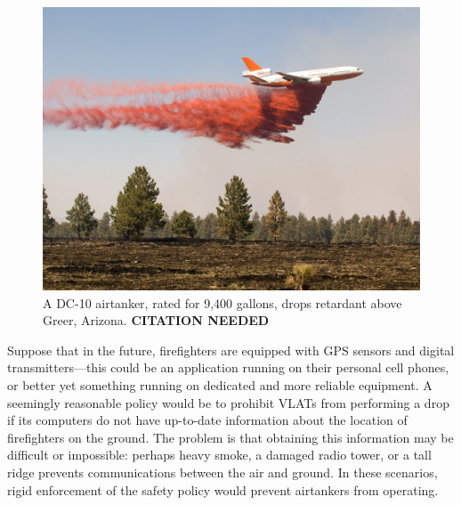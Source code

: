 \documentclass[]             %
{NASA}                       %
\theoremstyle{definition}
\begin{document}
\begin{figure}[h]
  \label{fig:airtanker}
  \centering
  \includegraphics[scale=0.4]{images/dc10.jpg}
  \caption{A DC-10 airtanker, rated for 9,400 gallons, drops retardant above Greer, Arizona. \textbf{CITATION NEEDED}}
\end{figure}

Suppose that in the future, firefighters are equipped with GPS sensors
and digital transmitters---this could be an application running on
their personal cell phones, or better yet something running on
dedicated and more reliable equipment. A seemingly reasonable policy
would be to prohibit VLATs from performing a drop if its computers do
not have up-to-date information about the location of firefighters on
the ground. The problem is that obtaining this information may be
difficult or impossible: perhaps heavy smoke, a damaged radio tower,
or a tall ridge prevents communications between the air and ground. In
these scenarios, rigid enforcement of the safety policy would prevent
airtankers from operating.
\end{document}
